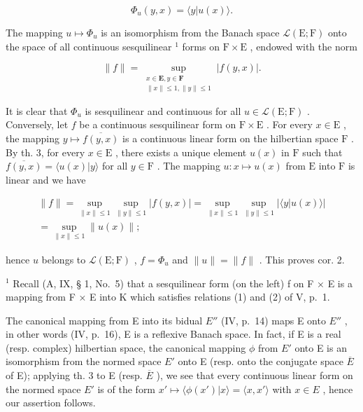 \[
\Phi_ {u} (y, x) = \langle y | u (x) \rangle .\tag{18}
\]

The mapping \(u \mapsto \Phi_u\) is an isomorphism from the Banach space \(\mathcal{L}(\mathrm{E};\mathrm{F})\) onto the space of all continuous sesquilinear \(^1\) forms on \(\mathrm{F} \times \mathrm{E}\) , endowed with the norm

\[
\| f\| = \sup_{\substack{x\in \mathbf{E},  y\in \mathbf{F}\\ \| x\| \leqslant 1, \| y\| \leqslant 1}}\left|f(y,x)\right|.\tag{19}
\]

It is clear that \(\Phi_u\) is sesquilinear and continuous for all \(u \in \mathcal{L}(\mathrm{E};\mathrm{F})\) . Conversely, let \(f\) be a continuous sesquilinear form on \(\mathrm{F} \times \mathrm{E}\) . For every \(x \in \mathrm{E}\) , the mapping \(y \mapsto \overline{f(y,x)}\) is a continuous linear form on the hilbertian space \(\mathrm{F}\) . By th. 3, for every \(x \in \mathrm{E}\) , there exists a unique element \(u(x)\) in \(\mathrm{F}\) such that \(\overline{f(y,x)} = \langle u(x)|y\rangle\) for all \(y \in \mathrm{F}\) . The mapping \(u: x \mapsto u(x)\) from \(\mathrm{E}\) into \(\mathrm{F}\) is linear and we have

\[
\begin{array}{l} \| f \| = \sup _ {\| x \| \leqslant 1} \sup _ {\| y \| \leqslant 1} | f (y, x) | = \sup _ {\| x \| \leqslant 1} \sup _ {\| y \| \leqslant 1} | \langle y | u (x) \rangle | \\ = \sup _ {\| x \| \leqslant 1} \| u (x) \|; \end{array}
\]

hence \(u\) belongs to \(\mathcal{L}(\mathrm{E};\mathrm{F})\) , \(f = \Phi_u\) and \(\| u\| = \| f\|\) . This proves cor. 2.

\(^{1}\) Recall (A, IX, § 1, No.~5) that a sesquilinear form (on the left) f on F × E is a mapping from F × E into K which satisfies relations (1) and (2) of V, p.~1.

The canonical mapping from E into its bidual \(E''\) (IV, p.~14) maps E onto \(E''\) , in other words (IV, p.~16), E is a reflexive Banach space. In fact, if E is a real (resp. complex) hilbertian space, the canonical mapping \(\phi\) from \(E'\) onto E is an isomorphism from the normed space \(E'\) onto E (resp. onto the conjugate space \(\overline{E}\) of E); applying th. 3 to E (resp. \(\overline{E}\) ), we see that every continuous linear form on the normed space \(E'\) is of the form \(x' \mapsto \langle \phi(x') | x \rangle = \langle x, x' \rangle\) with \(x \in E\) , hence our assertion follows.


